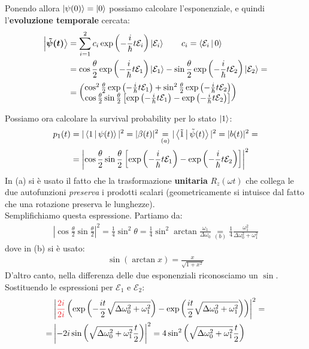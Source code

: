 \documentclass[../../InformazioneQuantistica.tex]{subfiles}
\begin{document}
\begin{enumerate}
Ponendo allora $\Ket{\psi(0)}=\Ket{0}$ possiamo calcolare l'esponenziale, e quindi l'\textbf{evoluzione temporale }cercata:
\begin{align*}
\bm{\Ket{\tilde{\psi}(t)}} &= \sum_{i=1}^2 c_i \exp\left(-\frac{i}{\hbar}t\mathcal{E}_i\right) \Ket{\mathcal{E}_i} \qquad c_i = \Braket{\mathcal{E}_i|0}\\
&= \cos\frac{\theta}{2} \exp\left(-\frac{i}{\hbar}t\mathcal{E}_1\right) \Ket{\mathcal{E}_1} -\sin\frac{\theta}{2} \exp\left(-\frac{i}{\hbar}t\mathcal{E}_2\right) \Ket{\mathcal{E}_2} = \\
&= \begin{pmatrix}
\cos^2 \frac{\theta}{2} \exp\left(-\frac{i}{\hbar} t \mathcal{E}_1 \right) + \sin^2 \frac{\theta}{2} \exp\left(-\frac{i}{\hbar}t \mathcal{E}_2\right) \\
\cos\frac{\theta}{2}\sin\frac{\theta}{2} \left[ \exp\left(-\frac{i}{\hbar}t \mathcal{E}_1\right) - \exp\left(-\frac{i}{\hbar} t \mathcal{E}_2 \right) \right]
\end{pmatrix}
\end{align*}

Possiamo ora calcolare la survival probability per lo stato $\Ket{1}$:
\begin{align*}
p_1(t) &= |\Braket{1|\psi(t)}|^2 = |\beta(t)|^2 \underset{(a)}{=}
|\Braket{\tilde{1}|\tilde{\psi}(t)}|^2=|b(t)|^2=
\\
&= \left| \cos\frac{\theta}{2}\sin\frac{\theta}{2} \left[ \exp\left(-\frac{i}{\hbar}t \mathcal{E}_1\right) - \exp\left(-\frac{i}{\hbar} t \mathcal{E}_2 \right) \right] \right|^2
\end{align*}
In (a) si è usato il fatto che la trasformazione \textbf{unitaria} $R_z(\omega t)$ che collega le due autofunzioni \textit{preserva} i prodotti scalari (geometricamente si intuisce dal fatto che una rotazione preserva le lunghezze).\\

Semplifichiamo questa espressione. Partiamo da:
\begin{align*}
   \left| \cos\frac{\theta}{2} \sin\frac{\theta}{2}\right|^2 = \frac{1}{4} \sin^2 \theta = \frac{1}{4} \sin^2 \arctan \frac{\omega_1}{\Delta \omega_0} \underset{(b)}{=} \frac{1}{4} \frac{\omega_1^2}{\Delta \omega_0^2 + \omega_1^2}
\end{align*}
dove in (b) si è usato:
\begin{align*}
    \sin(\arctan x) = \frac{x}{\sqrt{1+x^2}}
\end{align*}
D'altro canto, nella differenza delle due esponenziali riconosciamo un $\sin$. Sostituendo le espressioni per $\mathcal{E}_1$ e $\mathcal{E}_2$:
\begin{align*}
    &\left|\textcolor{Red}{\frac{2i}{2i}} \left( \exp\left(-\frac{it}{2}\sqrt{\Delta \omega_0^2 + \omega_1^2} \right) - \exp\left( \frac{it}{2}\sqrt{\Delta \omega_0^2 + \omega_1^2}\right) \right)\right|^2 = \\
    = & \left|-2i \sin\left(\sqrt{\Delta\omega_0^2 + \omega_1^2}\frac{t}{2}\right) \right|^2 = 4 \sin^2 \left(\sqrt{\Delta \omega_0^2 + \omega_1^2} \frac{t}{2}\right)
\end{align*}


\end{enumerate}
\end{document}
